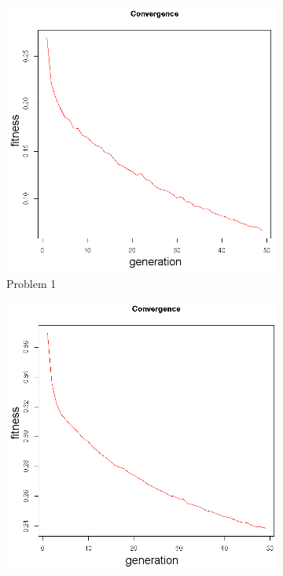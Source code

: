 \begin{figure}[!h]
   \centering
   \begin{subfigure}{0.3\textwidth}
       \includegraphics[width=\textwidth]{pics/convergence1.png}
	   \caption{Problem 1}
   \end{subfigure}
   \begin{subfigure}{0.3\textwidth}
       \includegraphics[width=\textwidth]{pics/convergence2.png}

\end{subfigure}
\end{figure}
